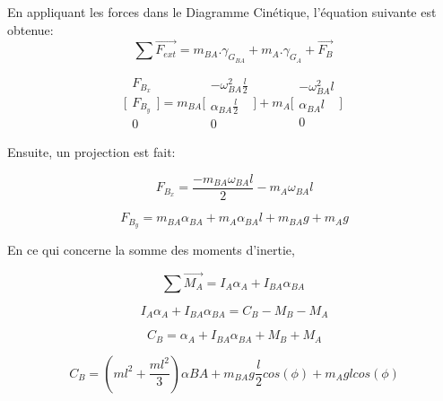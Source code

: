\documentclass{article}
\begin{document}
\noindent En appliquant les forces dans le Diagramme Cinétique, l'équation suivante est obtenue:
\begin{equation}
\sum \overrightarrow{F_{ext}} = m_{BA}.\gamma_{G_{BA}} + m_A.\gamma_{G_A} + \overrightarrow{F_B}
\end{equation}

\begin{equation}
    \Bigg[\begin{array}{cc}
    F_{B_x} \\
    F_{B_y} \\
    0
    \end{array}\Bigg]
    =
    m_{BA}\Bigg[\begin{array}{cc}
    -\omega^2_{BA}\frac{l}{2} \\
    \alpha_{BA}\frac{l}{2} \\
    0
    \end{array}\Bigg]
    +
    m_A\Bigg[\begin{array}{cc}
    -\omega^2_{BA}l \\
    \alpha_{BA}l \\
    0
    \end{array}\Bigg]
\end{equation}

\noindent Ensuite, un projection est fait:

\begin{equation}
\ F_{B_x} = \frac{-m_{BA}\omega_{BA}l}{2} - m_A\omega_{BA}l 
\end{equation}

\begin{equation}
\ F_{B_y} = m_{BA}\alpha_{BA} + m_A\alpha_{BA}l + m_{BA}g + m_Ag
\end{equation}

\noindent En ce qui concerne la somme des moments d'inertie, 

\begin{equation}
\sum \overrightarrow{M_A} = I_A\alpha_A + I_{BA}\alpha_{BA}
\end{equation}

\begin{equation}
\ I_A\alpha_A + I_{BA}\alpha_{BA} = C_B - M_B - M_A
\end{equation}

\begin{equation}
\ C_B = \alpha_A + I_{BA}\alpha_{BA} + M_B + M_A
\end{equation}

\begin{equation}
\ C_B = (ml^2 + \frac{ml^2}{3})\alpha{BA}+ m_{BA}g\frac{l}{2}cos(\phi) + m_Aglcos(\phi)
\end{equation}
\end{document}
